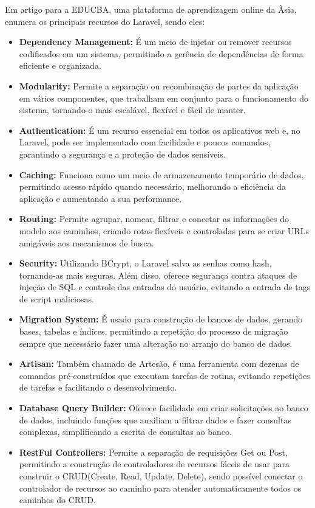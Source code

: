 Em artigo para a EDUCBA, uma plataforma de aprendizagem online da Àsia,  enumera os principais recursos do Laravel, sendo eles:
\begin{itemize}
\item {\bf Dependency Management:} É um meio de injetar ou remover recursos codificados em um sistema, permitindo a gerência de dependências de forma eficiente e organizada.
\item {\bf  Modularity:} Permite a separação ou recombinação de partes da aplicação em vários componentes, que trabalham em conjunto para o funcionamento do sistema, tornando-o mais escalável, flexível e fácil de manter.

\newpage
\item {\bf  Authentication:} É um recurso essencial em todos os aplicativos web e, no Laravel, pode ser implementado com facilidade e poucos comandos, garantindo a segurança e a proteção de dados sensíveis.

\item {\bf  Caching:} Funciona como um meio de armazenamento temporário de dados, permitindo acesso rápido quando necessário, melhorando a eficiência da aplicação e aumentando a sua performance.

\item {\bf  Routing:} Permite agrupar, nomear, filtrar e conectar as informações do modelo aos caminhos, criando rotas flexíveis e controladas para se criar URLs amigáveis aos mecanismos de busca.

\item {\bf  Security:} Utilizando BCrypt, o Laravel salva as senhas como hash, tornando-as mais seguras. Além disso, oferece segurança contra ataques de injeção de SQL e controle das entradas do usuário, evitando a entrada de tags de script maliciosas.

\item {\bf  Migration System:} É usado para construção de bancos de dados, gerando bases, tabelas e índices, permitindo a repetição do processo de migração sempre que necessário fazer uma alteração no arranjo do banco de dados.

\item {\bf  Artisan:} Também chamado de Artesão, é uma ferramenta com dezenas de comandos pré-construídos que executam tarefas de rotina, evitando repetições de tarefas e facilitando o desenvolvimento.

\item {\bf Database Query Builder:} Oferece facilidade em criar solicitações ao banco de dados, incluindo funções que auxiliam a filtrar dados e fazer consultas complexas, simplificando a escrita de consultas ao banco.

\item {\bf RestFul Controllers:} Permite a separação de requisições Get ou Post, permitindo a construção de controladores de recursos fáceis de usar para construir o CRUD(Create, Read, Update, Delete), sendo possível conectar o controlador de recursos ao caminho para atender automaticamente todos os caminhos do CRUD.
\end{itemize}

